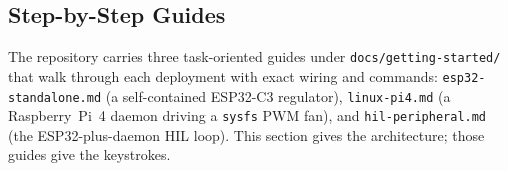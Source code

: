 \subsection{Step-by-Step Guides}

The repository carries three task-oriented guides under \texttt{docs/getting-started/} that walk through each deployment with exact wiring and commands: \texttt{esp32-standalone.md} (a self-contained ESP32-C3 regulator), \texttt{linux-pi4.md} (a Raspberry~Pi~4 daemon driving a \texttt{sysfs} PWM fan), and \texttt{hil-peripheral.md} (the ESP32-plus-daemon HIL loop). This section gives the architecture; those guides give the keystrokes.

\endinput
